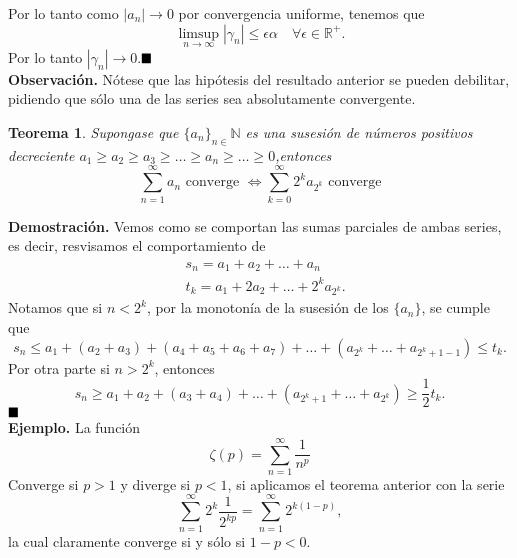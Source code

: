 \documentclass[letterpaper]{book}
\newtheorem{teorema}{Teorema}[section]
\newcommand{\nat}{\ensuremath{ \mathbb N }}
\newcommand{\eje}{{\noindent \sc \textbf{Ejemplo. }}}
\newcommand{\obs}{{\noindent \sc \textbf{Observación. }}}
\newcommand{\dem}{{\noindent \sc \textbf{Demostraci\'on. }}}
\newcommand{\QED}{\ensuremath{\hspace*{0em plus 1fill}\blacksquare}}
\newcommand{\re}{\ensuremath{\mathbb R }}
\begin{document}
\noindent Por lo tanto como \(|a_n|\to0\) por convergencia uniforme, tenemos que
\[
\limsup_{n\to\infty} |\gamma_n|\leq\epsilon\alpha\quad\forall\epsilon\in\re^{+}.
\]
\noindent Por lo tanto \(|\gamma_n|\to0\).\QED\\
\obs Nótese que las hipótesis del resultado anterior se pueden debilitar, pidiendo que sólo una de las series sea absolutamente convergente.
\begin{teorema}
Supongase que \(\{a_n\}_{n\in}\nat\) es una susesión de números positivos decreciente \(a_1\geq a_2\geq a_3\geq\dots\geq a_n\geq\dots\geq0\),entonces
\[
\sum_{n=1}^\infty a_n\text{ converge }\iff  \sum_{k=0}^\infty 2^ka_{2^k}\text{ converge}
\]
\end{teorema}
\dem Vemos como se comportan las sumas parciales de ambas series, es decir, resvisamos el comportamiento de
\begin{align*}
&s_n=a_1+a_2+\dots+a_n\\
&t_k=a_1+2a_2+\dots+2^ka_{2^k}.
\end{align*}
\noindent Notamos que si \(n<2^k\), por la monotonía de la susesión de los \(\{a_n\}\), se cumple que
\[s_n\leq a_1 + (a_2+a_3)+(a_4+a_5+a_6+a_7)+\dots+(a_{2^k}+\dots+a_{2^k+1-1})\leq t_k.\]
Por otra parte si \(n>2^k\), entonces
\[s_n\geq a_1 + a_2+(a_3+a_4)+\dots+(a_{2^k+1}+\dots+a_{2^k})\geq\frac{1}{2} t_k.\]
\QED\\
\eje La función
\[
\zeta(p)=\sum_{n=1}^{\infty}\frac{1}{n^p}
\]
Converge si \(p>1\) y diverge si \(p<1\), si aplicamos el teorema anterior con la serie
\[
\sum_{n=1}^{\infty}2^k\frac{1}{2^{kp}}=\sum_{n=1}^{\infty}2^{k(1-p)},
\]
\noindent la cual claramente converge si y sólo si \(1-p<0\).
\end{document}

